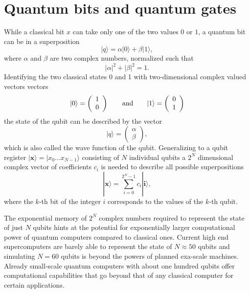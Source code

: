 \documentclass[journal]{IEEEtran}
\begin{document}
\section{Quantum bits and quantum gates}
\label{sec:box1}
While a classical bit $x$ can take only one of the two values $0$ or $1$, a quantum bit can be in a superposition
\begin{equation}
|q\rangle = \alpha |0\rangle +\beta|1\rangle,
\end{equation}
where $\alpha$ and $\beta$ are two complex numbers, normalized such that
\begin{equation}
|\alpha|^2+|\beta|^2=1.
\end{equation}
 Identifying the two classical states 0 and 1 with two-dimensional complex valued vectors vectors 
 \begin{equation}
 |0\rangle = \left(\begin{array}{c}1\\0\end{array}\right) \qquad {\rm and} \qquad  |1\rangle = \left(\begin{array}{c}0\\1\end{array}\right)
 \end{equation}
  the state of the qubit can be described by the vector 
  \begin{equation}
  |q\rangle = \left(\begin{array}{c}\alpha\\\beta\end{array}\right),
  \end{equation} which is also called the wave function of the qubit. Generalizing to a qubit register $| \mathbf{x}\rangle=|x_0\ldots x_{N-1}\rangle$ consisting of $N$ individual qubits a $2^N$ dimensional complex vector of coefficients $c_i$ is needed to describe all possible superpositions
  \begin{equation}
  |\mathbf{x}\rangle = \sum_{i=0}^{2^N-1} c_i |\mathbf{i}\rangle,
  \end{equation}
where the $k$-th bit of the integer $i$ corresponds to the values of the $k$-th qubit.

The exponential memory of $2^N$ complex numbers required to represent the state of just $N$ qubits hints at the potential for exponentially larger computational power of quantum computers compared to classical ones. Current high end supercomputers are barely able to represent the state of $N\approx50$ qubits and simulating $N=60$ qubits is beyond the powers of planned exa-scale machines. Already small-scale quantum computers with about one hundred qubits offer computational capabilities that go beyond that of any classical computer for certain applications.
\end{document}
